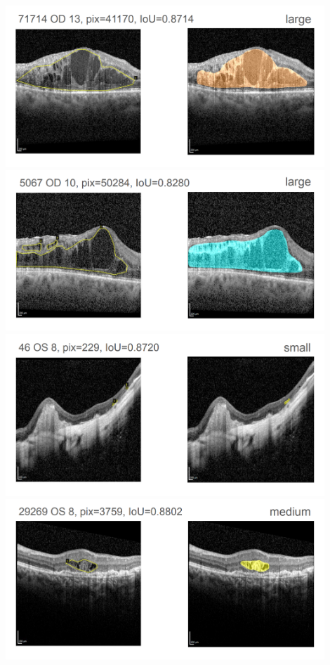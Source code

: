 \includegraphics[width=0.9\textwidth]{./pic/Segmentierung/Segmentierungsergebnisse/41.PNG}
\includegraphics[width=0.9\textwidth]{./pic/Segmentierung/Segmentierungsergebnisse/42.PNG}
\includegraphics[width=0.9\textwidth]{./pic/Segmentierung/Segmentierungsergebnisse/43.PNG}
\includegraphics[width=0.9\textwidth]{./pic/Segmentierung/Segmentierungsergebnisse/44.PNG}

